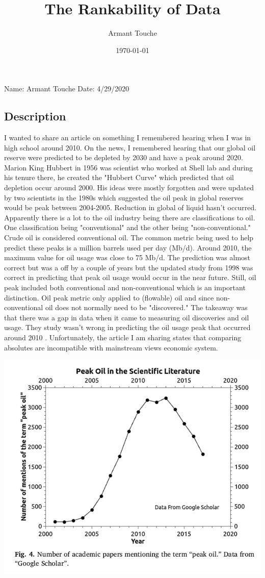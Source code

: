 \documentclass[a4paper,man,biblatex]{apa6}
\title{The Rankability of Data}
\author{Armant Touche}
\affiliation{Portland State University}
\date{\today}
\begin{document}
\thispagestyle{otherpage}
\setcounter{biburllcpenalty}{7000}
\setcounter{biburlucpenalty}{8000}


\noindent Name: Armant Touche\newline
\noindent Date: 4/29/2020

\subsection{Description} I wanted to share an article on something I remembered hearing when I was in high school around 2010. On the news, I remembered hearing that our global oil reserve were predicted to be depleted by 2030 and have a peak around 2020. Marion King Hubbert in 1956 was scientist who worked at Shell lab and during his tenure there, he created the "Hubbert Curve" which predicted that oil depletion occur around 2000. His ideas were mostly forgotten and were updated by two scientists in the 1980s which suggested the oil peak in global reserves would be peak between 2004-2005. Reduction in global of liquid hasn't occurred.  Apparently there is a lot to the oil industry being there are classifications to oil. One classification being "conventional" and the other being "non-conventional." Crude oil is considered conventional oil. The common metric being used to help predict these peaks is a million barrels used per day (Mb/d). Around 2010, the maximum value for oil usage was close to 75 Mb/d. The prediction was almost correct but was a off by a couple of years but the updated study from 1998 was correct in predicting that peak oil usage would occur in the near future. Still, oil peak included both conventional and non-conventional which is an important distinction. Oil peak metric only applied to (flowable) oil and since non-conventional oil does not normally need to be "discovered." The takeaway was that there was a gap in data when it came to measuring oil discoveries and oil usage. They study wasn't wrong in predicting the oil usage peak that occurred around 2010 \autocite{oilpeak}. Unfortunately, the article I am sharing states that comparing absolutes are incompatible with mainstream views economic system.

            \begin{center}
            \includegraphics[width=.5\textwidth]{google_data}
            \end{center}
\end{document}
